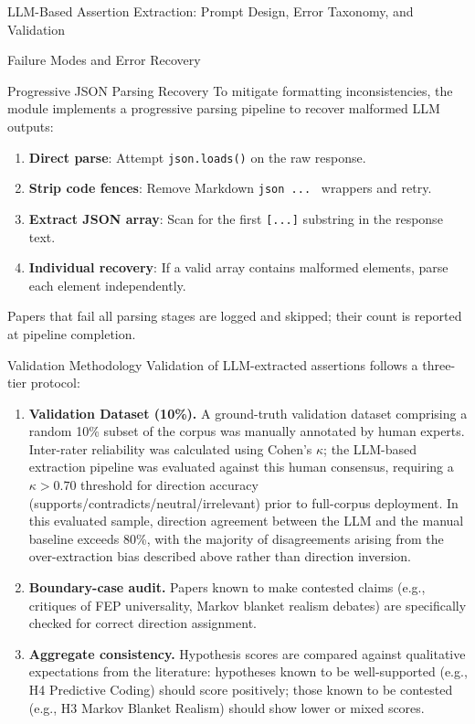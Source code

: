\documentclass[
  ignorenonframetext,
]{beamer}
\providecommand{\tightlist}{%
  \setlength{\itemsep}{0pt}\setlength{\parskip}{0pt}}
\begin{document}
\begin{frame}[fragile]{LLM-Based Assertion Extraction: Prompt Design,
Error Taxonomy, and Validation \label{sec:extraction_pipeline}}
\begin{block}{Failure Modes and Error Recovery}
\begin{block}{Progressive JSON Parsing Recovery}
\protect{}\label{progressive-json-parsing-recovery}
To mitigate formatting inconsistencies, the module implements a
progressive parsing pipeline to recover malformed LLM outputs:

\begin{enumerate}
\tightlist
\item
  \textbf{Direct parse}: Attempt \texttt{json.loads()} on the raw
  response.
\item
  \textbf{Strip code fences}: Remove Markdown
  \texttt{\textasciigrave{}\textasciigrave{}\textasciigrave{}json\ ...\ \textasciigrave{}\textasciigrave{}\textasciigrave{}}
  wrappers and retry.
\item
  \textbf{Extract JSON array}: Scan for the first \texttt{{[}...{]}}
  substring in the response text.
\item
  \textbf{Individual recovery}: If a valid array contains malformed
  elements, parse each element independently.
\end{enumerate}

Papers that fail all parsing stages are logged and skipped; their count
is reported at pipeline completion.
\end{block}
\end{block}

\begin{block}{Validation Methodology}
\protect{}\label{validation-methodology}
Validation of LLM-extracted assertions follows a three-tier protocol:

\begin{enumerate}
\item
  \textbf{Validation Dataset (10\%).} A ground-truth validation dataset
  comprising a random 10\% subset of the corpus was manually annotated
  by human experts. Inter-rater reliability was calculated using Cohen's
  \(\kappa\); the LLM-based extraction pipeline was evaluated against
  this human consensus, requiring a \(\kappa > 0.70\) threshold for
  direction accuracy (supports/contradicts/neutral/irrelevant) prior to
  full-corpus deployment. In this evaluated sample, direction agreement
  between the LLM and the manual baseline exceeds 80\%, with the
  majority of disagreements arising from the over-extraction bias
  described above rather than direction inversion.
\item
  \textbf{Boundary-case audit.} Papers known to make contested claims
  (e.g., critiques of FEP universality, Markov blanket realism debates)
  are specifically checked for correct direction assignment.
\item
  \textbf{Aggregate consistency.} Hypothesis scores are compared against
  qualitative expectations from the literature: hypotheses known to be
  well-supported (e.g., H4 Predictive Coding) should score positively;
  those known to be contested (e.g., H3 Markov Blanket Realism) should
  show lower or mixed scores.
\end{enumerate}


\end{block}
\end{frame}
\end{document}
